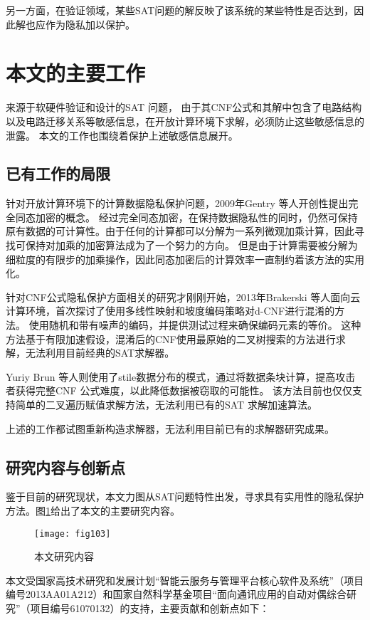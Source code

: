 另一方面，在验证领域，某些SAT问题的解反映了该系统的某些特性是否达到，因此解也应作为隐私加以保护。

\section{本文的主要工作}
来源于软硬件验证和设计的SAT 问题，
由于其CNF公式和其解中包含了电路结构以及电路迁移关系等敏感信息，在开放计算环境下求解，必须防止这些敏感信息的泄露。
本文的工作也围绕着保护上述敏感信息展开。

\subsection{已有工作的局限}
针对开放计算环境下的计算数据隐私保护问题，2009年Gentry 等人开创性提出完全同态加密的概念。
经过完全同态加密，在保持数据隐私性的同时，仍然可保持原有数据的可计算性。由于任何的计算都可以分解为一系列微观加乘计算，因此寻找可保持对加乘的加密算法成为了一个努力的方向。
但是由于计算需要被分解为细粒度的有限步的加乘操作，因此同态加密后的计算效率一直制约着该方法的实用化。

针对CNF公式隐私保护方面相关的研究才刚刚开始，2013年Brakerski 等人面向云计算环境，首次探讨了使用多线性映射和坡度编码策略对d-CNF进行混淆的方法。
使用随机和带有噪声的编码，并提供测试过程来确保编码元素的等价。
这种方法基于有限加速假设，混淆后的CNF使用最原始的二叉树搜索的方法进行求解，无法利用目前经典的SAT求解器。

Yuriy Brun 等人则使用了stile数据分布的模式，通过将数据条块计算，提高攻击者获得完整CNF 公式难度，以此降低数据被窃取的可能性。
该方法目前也仅仅支持简单的二叉遍历赋值求解方法，无法利用已有的SAT 求解加速算法。

上述的工作都试图重新构造求解器，无法利用目前已有的求解器研究成果。

\subsection{研究内容与创新点}
鉴于目前的研究现状，本文力图从SAT问题特性出发，寻求具有实用性的隐私保护方法。图\ref{fig:103}给出了本文的主要研究内容。

\begin{figure}[t] %
  \centering
  \texttt{[image: fig103]}
  \caption{本文研究内容}
  \label{fig:103}
\end{figure}

本文受国家高技术研究和发展计划“智能云服务与管理平台核心软件及系统”（项目编号2013AA01A212）和国家自然科学基金项目“面向通讯应用的自动对偶综合研究”（项目编号61070132）的支持，主要贡献和创新点如下：

